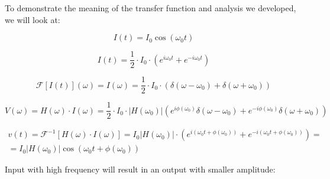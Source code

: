 To demonstrate the meaning of the transfer function and analysis we developed, we will look at:

\begin{equation}
    I(t) = I_0 \cos(\omega_0 t)
\end{equation}

\begin{equation}
    I(t) = \frac{1}{2} \cdot I_0 \cdot \left(e^{i\omega_0 t} + e^{-i\omega_0 t}\right)
\end{equation}

\begin{equation}
    \mathcal{F}[I(t)](\omega) = I(\omega) = \frac{1}{2} \cdot I_0 \cdot \left(\delta(\omega - \omega_0) + \delta(\omega + \omega_0)\right)
\end{equation}

\begin{equation}
    V(\omega) = H(\omega) \cdot I(\omega) = \frac{1}{2}  \cdot I_0 \cdot |H(\omega_0)| \left(e^{i\phi(\omega_0)} \delta(\omega - \omega_0) + e^{-i\phi(\omega_0)} \delta(\omega + \omega_0)\right)
\end{equation}

\begin{equation}
\begin{aligned}
    v(t) = \mathcal{F}^{-1}[H(\omega) \cdot I(\omega)] = I_0 |H(\omega_0)| \cdot \left(e^{i(\omega_0 t + \phi(\omega_0))} + e^{-i(\omega_0 t + \phi(\omega_0))}\right) = \\ = I_0 |H(\omega_0)| \cos(\omega_0 t + \phi(\omega_0))
\end{aligned}
\end{equation}

Input with high frequency will result in an output with smaller amplitude:
